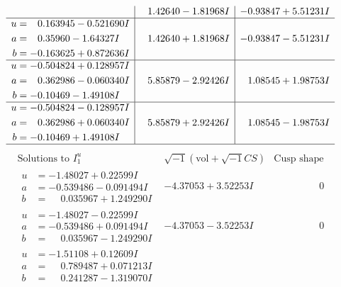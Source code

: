 \documentclass[1p]{elsarticle_modified}
\theoremstyle{definition}
\newcommand{\I}{\sqrt{-1}}
\begin{document}
$$\begin{array}{c|c|c}
 & \phantom{-}1.42640 - 1.81968 I & -0.93847 + 5.51231 I \\ \hline\begin{aligned}
u &= \phantom{-}0.163945 - 0.521690 I \\
a &= \phantom{-}0.35960 - 1.64327 I \\
b &= -0.163625 + 0.872636 I\end{aligned}
 & \phantom{-}1.42640 + 1.81968 I & -0.93847 - 5.51231 I \\ \hline\begin{aligned}
u &= -0.504824 + 0.128957 I \\
a &= \phantom{-}0.362986 - 0.060340 I \\
b &= -0.10469 - 1.49108 I\end{aligned}
 & \phantom{-}5.85879 - 2.92426 I & \phantom{-}1.08545 + 1.98753 I \\ \hline\begin{aligned}
u &= -0.504824 - 0.128957 I \\
a &= \phantom{-}0.362986 + 0.060340 I \\
b &= -0.10469 + 1.49108 I\end{aligned}
 & \phantom{-}5.85879 + 2.92426 I & \phantom{-}1.08545 - 1.98753 I\\
 \hline 
 \end{array}$$\newpage$$\begin{array}{c|c|c}  
\text{Solutions to }I^u_{1}& \I (\text{vol} + \sqrt{-1}CS) & \text{Cusp shape}\\
 \hline 
\begin{aligned}
u &= -1.48027 + 0.22599 I \\
a &= -0.539486 - 0.091494 I \\
b &= \phantom{-}0.035967 + 1.249290 I\end{aligned}
 & -4.37053 + 3.52253 I & \phantom{-0.000000 } 0 \\ \hline\begin{aligned}
u &= -1.48027 - 0.22599 I \\
a &= -0.539486 + 0.091494 I \\
b &= \phantom{-}0.035967 - 1.249290 I\end{aligned}
 & -4.37053 - 3.52253 I & \phantom{-0.000000 } 0 \\ \hline\begin{aligned}
u &= -1.51108 + 0.12609 I \\
a &= \phantom{-}0.789487 + 0.071213 I \\
b &= \phantom{-}0.241287 - 1.319070 I\end{aligned}

\end{array}$$
\end{document}
